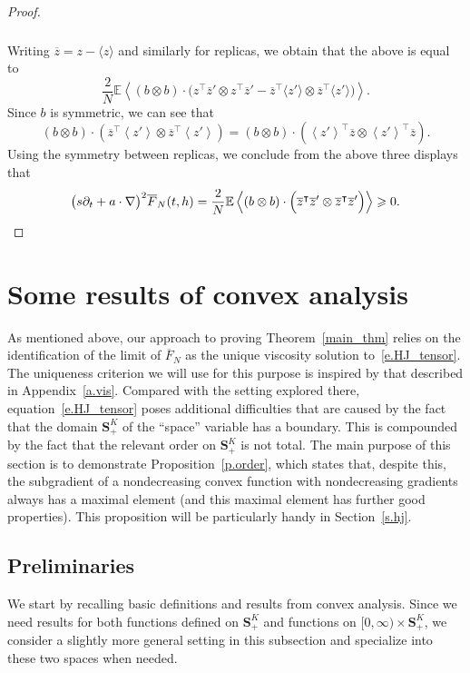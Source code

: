 \documentclass[AHL,Unicode,longabstracts,published]{cedram}
\newcommand{\E}{\mathbb{E}}
\renewcommand{\S}{\mathbf{S}}
\renewcommand{\geq}{\geqslant}
\renewcommand{\bar}{\overline}
\newcommand{\la}{\left\langle}
\newcommand{\ra}{\right\rangle}
\begin{document}
\begin{proof}
\begin{multline*}
\begin{aligned}
\end{aligned}
\end{multline*}
Writing $\bar z = z -\langle z \rangle$ and similarly for replicas, we obtain that the above is equal to
\[
\frac{2}{N}\E\la (b\otimes b)\cdot\Big(z^\intercal \bar z'\otimes z^\intercal \bar z' - \bar z^\intercal \langle z'\rangle \otimes \bar z^\intercal \langle z'\rangle\Big) \ra.
\]
Since $b$ is symmetric, we can see that
\[
(b\otimes b) \cdot \left(\bar z^\intercal \left\langle z'\right\rangle \otimes \bar z^\intercal \left\langle z'\right\rangle\right) = (b\otimes b) \cdot \left(\left\langle z'\right\rangle^\intercal \bar z \otimes \left\langle z'\right\rangle^\intercal \bar z\right).
\]
Using the symmetry between replicas, we conclude from the above three displays that
\[
\big(s\partial_t + a\cdot\nabla\big)^2\bar F_N(t,h)=\frac{2}{N}\E\la (b\otimes b)\cdot\Big(\bar z^\intercal \bar z'\otimes \bar z^\intercal \bar z' \Big) \ra\geq 0. \qedhere
\]
\end{proof}



\section{Some results of convex analysis}\label{s.convex}

As mentioned above, our approach to proving Theorem~\ref{main_thm} relies on the identification of the limit of $\bar F_N$ as the unique viscosity solution to~\eqref{e.HJ_tensor}. The uniqueness criterion we will use for this purpose is inspired by that described in Appendix~\ref{a.vis}. Compared with the setting explored there, equation~\eqref{e.HJ_tensor} poses additional difficulties that are caused by the fact that the domain $\S^K_+$ of the ``space'' variable has a boundary. This is compounded by the fact that the relevant order on $\S^K_+$ is not total. The main purpose of this section is to demonstrate Proposition~\ref{p.order}, which states that, despite this, the subgradient of a nondecreasing convex function with nondecreasing gradients always has a maximal element (and this maximal element has further good properties). This proposition will be particularly handy in Section~\ref{s.hj}.

\subsection{Preliminaries}


We start by recalling basic definitions and results from convex analysis. Since we need results for both functions defined on $\S^K_+$ and functions on $[0,\infty)\times \S^K_+$, we consider a slightly more general setting in this subsection and specialize into these two spaces when needed.
\end{document}
